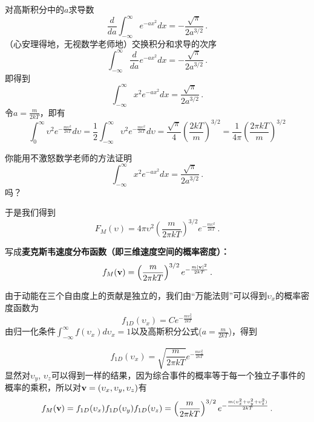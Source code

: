 \documentclass[CJK]{beamer}
\begin{document}
\begin{frame}
\bch
{\small
对高斯积分中的$a$求导数
$$\frac{d}{da}\int_{-\infty}^\infty e^{-ax^2}dx =-\frac{\sqrt{\pi}}{2a^{3/2}} \,.$$
（心安理得地，无视数学老师地\bye）交换积分和求导的次序
$$\int_{-\infty}^\infty \frac{d }{da}e^{-ax^2} dx =-\frac{\sqrt{\pi}}{2a^{3/2}} \,.$$
即得到
$$\int_{-\infty}^\infty x^2 e^{-ax^2} dx =\frac{\sqrt{\pi}}{2a^{3/2}} \,.$$
令$a = \frac{m}{2kT}$，即有
$$\int_0^\infty \upsilon^2 e^{-\frac{m\upsilon^2}{2kT}}d\upsilon =\frac{1}{2}\int_{-\infty}^\infty \upsilon^2 e^{-\frac{m\upsilon^2}{2kT}}d\upsilon = \frac{\sqrt{\pi}}{4}\left(\frac{2kT}{m}\right)^{3/2}=\frac{1}{4\pi}\left(\frac{2\pi kT}{m}\right)^{3/2} $$
}
\ech
\end{frame}

\begin{frame}
\bch


你能用不激怒数学老师的方法证明
$$\int_{-\infty}^\infty x^2 e^{-ax^2} dx =\frac{\sqrt{\pi}}{2a^{3/2}} \,.$$
吗？

\ech
\end{frame}

\begin{frame}
\bch
{\small
于是我们得到
$$F_M(\upsilon) = 4\pi \upsilon^2 \left(\frac{m}{2\pi kT}\right)^{3/2} e^{-\frac{m\upsilon^2}{2kT}}\,.$$

写成{\bf \blue 麦克斯韦速度分布函数（即三维速度空间的概率密度）：
$$f_M({\mathbf{v}}) = \left(\frac{m}{2\pi kT}\right)^{3/2} e^{-\frac{m|{\mathbf{v}}|^2}{2kT}}\, .$$}
}
\ech
\end{frame}

\begin{frame}
\bch
{\small
由于动能在三个自由度上的贡献是独立的，我们由“万能法则”可以得到$\upsilon_x$的概率密度函数为
$$ f_{1D}(\upsilon_x) =  C e^{-\frac{m\upsilon_x^2}{2kT}}$$
由归一化条件$\int_{-\infty}^\infty f(\upsilon_x)d\upsilon_x = 1$以及高斯积分公式($a = \frac{m}{2kT}$)，得到

$$ f_{1D}(\upsilon_x) =   \sqrt{\frac{m}{2\pi kT}} e^{-\frac{m\upsilon_x^2}{2kT}}$$
显然对$\upsilon_y$, $\upsilon_z$可以得到一样的结果，因为综合事件的概率等于每一个独立子事件的概率的乘积，所以对${\mathbf{v}} = (\upsilon_x, \upsilon_y, \upsilon_z)$有
$$f_M({\mathbf{v}}) = f_{1D}(\upsilon_x)f_{1D}(\upsilon_y)f_{1D}(\upsilon_z)=  \left(\frac{m}{2\pi kT}\right)^{3/2} e^{-\frac{m(\upsilon_x^2+\upsilon_y^2+\upsilon_z^2)}{2kT}}   \, .$$
}
\ech
\end{frame}
\end{document}
